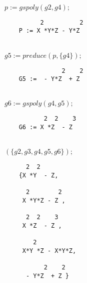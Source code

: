 \hspace*{+1cm}{\it \% next S-polynomial} \\
\hspace*{+1cm} $p :=  gspoly(g2,g4); $

\begin{verbatim}
          2          2
    P := X *Y*Z - Y*Z
 \end{verbatim}

\hspace*{+1cm}{\it \% and reducing, here only by g4, but preduce
needs a list} \\ \hspace*{+1cm} $g5  :=  preduce(p,\{g4\}); $

\begin{verbatim}
                2    2
    G5 :=  - Y*Z  + Z
\end{verbatim}

\hspace*{+1cm}{\it \% last S-polynomial} \\
\hspace*{+1cm}$ g6  :=  gspoly(g4,g5);$

\begin{verbatim}
           2  2    3
    G6 := X *Z  - Z
\end{verbatim}

\hspace*{+1cm}{\it \% and the final basis sorted descending} \\
\hspace*{+1cm}{\it gsort} $(\{g2,g3,g4,g5,g6\});$

\begin{verbatim}
      2  2
    {X *Y  - Z,

      2        2
     X *Y*Z - Z ,

      2  2    3
     X *Z  - Z ,

        2
     X*Y *Z - X*Y*Z,

           2    2
      - Y*Z  + Z }
 \end{verbatim}

